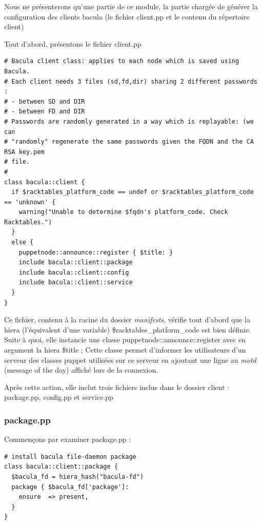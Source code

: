 \documentclass[14 pt]{extreport}
\begin{document}
Nous ne présenterons qu'une partie de ce module, la partie chargée de générer la configuration des clients bacula (le fichier client.pp et le contenu du répertoire client)

Tout d'abord, présentons le fichier client.pp

\begin{framed}
\begin{Verbatim}[fontsize=\scriptsize]
# Bacula client class: applies to each node which is saved using Bacula.
# Each client needs 3 files (sd,fd,dir) sharing 2 different passwords :
# - between SD and DIR
# - between FD and DIR
# Passwords are randomly generated in a way which is replayable: (we can
# "randomly" regenerate the same passwords given the FQDN and the CA RSA key.pem
# file.
#
class bacula::client {
  if $racktables_platform_code == undef or $racktables_platform_code == 'unknown' {
    warning("Unable to determine $fqdn's platform_code. Check Racktables.")
  }
  else {
    puppetnode::announce::register { $title: }
    include bacula::client::package
    include bacula::client::config
    include bacula::client::service
  }
}\end{Verbatim}
\end{framed}

Ce fichier, contenu à la racine du dossier \emph{manifests}, vérifie tout d'abord que la hiera (l'équivalent d'une variable) \$racktables\_platform\_code est bien définie. Suite à quoi, elle instancie une classe puppetnode::announce::register avec en argument la hiera \$title ; Cette classe permet d'informer les utilisateurs d'un serveur des classes puppet utilisées sur ce serveur en ajoutant une ligne au \emph{motd} (message of the day) affiché lors de la connexion.

Après cette action, elle inclut trois fichiers inclus dans le dossier client : package.pp, config.pp et service.pp

\subsubsection*{package.pp}

Commençons par examiner package.pp :

\begin{framed}
\begin{Verbatim}[fontsize=\scriptsize]
# install bacula file-daemon package
class bacula::client::package {
  $bacula_fd = hiera_hash("bacula-fd")
  package { $bacula_fd['package']:
    ensure  => present,
  }
}\end{Verbatim}
\end{framed}
\end{document}

